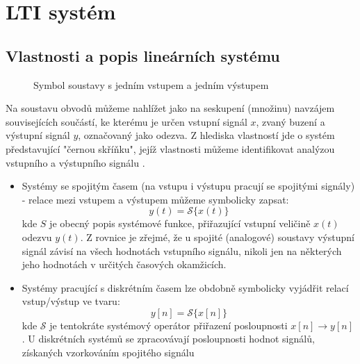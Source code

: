 \chapter{LTI systém}
\minitoc
\newpage
  \section{Vlastnosti a popis lineárních systému}
    \begin{wrapfigure}{r}{2in}
      \centering      
      
      \caption[Symbol soustavy s jedním vstupem a jedním výstupem]{Symbol soustavy s jedním vstupem a 
               jedním výstupem}
      \label{sas:fig_soustava}   
    \end{wrapfigure}
    Na soustavu obvodů můžeme nahlížet jako na seskupení (množinu) navzájem souvisejících součástí, ke 
    kterému je určen vstupní signál $x$, zvaný buzení a výstupní signál $y$, označovaný jako 
    odezva. Z hlediska vlastností jde o systém představující "černou skříňku", jejíž vlastnosti můžeme 
    identifikovat analýzou vstupního a výstupního signálu \cite{Bicak}.
        
    \begin{itemize}
      \item Systémy se spojitým časem (na vstupu i výstupu pracují se spojitými signály) - relace mezi 
            vstupem a výstupem můžeme symbolicky zapsat:
            \begin{equation}\label{sas:eq_spojity_system}
              y(t)=\mathcal{S}\{x(t)\}
            \end{equation}
            kde $S$ je obecný popis systémové funkce, přiřazující vstupní veličině $x(t)$ odezvu $y(t)$. Z 
            rovnice je zřejmé, že u spojité (analogové) soustavy výstupní signál závisí na všech hodnotách 
            vstupního signálu, nikoli jen na některých jeho hodnotách v určitých časových okamžicích.
      \item Systémy pracující s diskrétním časem lze obdobně symbolicky vyjádřit relací vstup/výstup ve tvaru:
            \begin{equation}\label{sas:eq_dis_system}
              y[n]=\mathcal{S}\{x[n]\}
            \end{equation}
            kde $\mathcal{S}$ je tentokráte systémový operátor přiřazení posloupnosti $x[n]\rightarrow y[n]$. 
            U diskrétních systémů se zpracovávají posloupnosti hodnot signálů, získaných vzorkováním 
            spojitého signálu
    \end{itemize}
    
